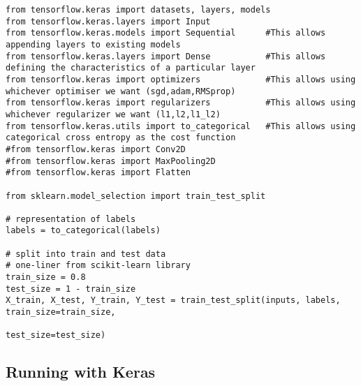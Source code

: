 \documentclass[%
oneside,                 %
final,                   %
10pt]{article}
\begin{document}
\begin{verbatim}
from tensorflow.keras import datasets, layers, models
from tensorflow.keras.layers import Input
from tensorflow.keras.models import Sequential      #This allows appending layers to existing models
from tensorflow.keras.layers import Dense           #This allows defining the characteristics of a particular layer
from tensorflow.keras import optimizers             #This allows using whichever optimiser we want (sgd,adam,RMSprop)
from tensorflow.keras import regularizers           #This allows using whichever regularizer we want (l1,l2,l1_l2)
from tensorflow.keras.utils import to_categorical   #This allows using categorical cross entropy as the cost function
#from tensorflow.keras import Conv2D
#from tensorflow.keras import MaxPooling2D
#from tensorflow.keras import Flatten

from sklearn.model_selection import train_test_split

# representation of labels
labels = to_categorical(labels)

# split into train and test data
# one-liner from scikit-learn library
train_size = 0.8
test_size = 1 - train_size
X_train, X_test, Y_train, Y_test = train_test_split(inputs, labels, train_size=train_size,
                                                    test_size=test_size)

\end{verbatim}


\subsection*{Running with Keras}
\end{document}
